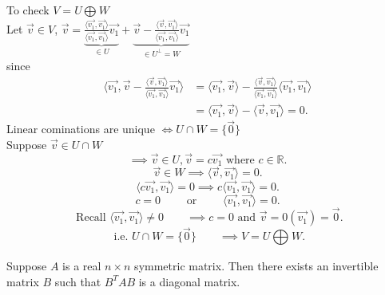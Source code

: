 \documentclass{report}
\begin{document}
{         To check $ V = U \bigoplus_{} W$ \\
         Let $ \vec{ v} \in V$, $ \vec{ v} = \underbrace{ \frac{ \langle \vec{ v_1} ,\vec{ v_1}   \rangle   }{ \langle \vec{ v_1} ,\vec{ v_1}   \rangle  } \vec{ v_1}  }_{  \in U} +  \underbrace{ \vec{ v} - \frac{ \langle \vec{ v} , \vec{ v_1}   \rangle   }{ \langle \vec{ v_1} , \vec{ v_1} \rangle  } \vec{ v_1}  }_{ \in U ^{\perp} = W }$\\
         since 
         \begin{align*}
          \langle \vec{ v_1} ,\vec{ v} - \frac{ \langle \vec{ v} , \vec{ v_1}   \rangle   }{ \langle \vec{ v_1} , \vec{ v_1}   \rangle   } \vec{ v_1}   \rangle &= \langle \vec{ v_1} ,\vec{ v}   \rangle - \frac{ \langle \vec{ v} , \vec{ v_1}   \rangle   }{ \langle \vec{ v_1} , \vec{ v_1}   \rangle   }  \langle \vec{ v_1} ,\vec{ v_1}   \rangle  \\
          &= \langle \vec{ v_1} ,\vec{ v}   \rangle - \langle \vec{ v} , \vec{ v_1}   \rangle =0
         .\end{align*}
         Linear cominations are unique $  \iff U \cap W = \{ \vec{ 0} \}$ \\
         Suppose $ \vec{ v} \in U \cap  W$
         \[
         \implies \vec{ v} \in U, \vec{ v} = c \vec{ v_1} \text{ where } c \in \mathbb{R}
         .\] 
         \[
         \vec{ v} \in W \implies \langle \vec{ v} , \vec{ v_1}   \rangle =0
         .\] 
         \[
         \langle c \vec{ v_1} , \vec{ v_1}   \rangle =0 \implies c \langle \vec{ v_1} , \vec{ v_1}   \rangle =0
         .\] 
         \[
         c=0 \qquad  \text{ or } \qquad  \langle \vec{ v_1} , \vec{ v_1}   \rangle =0
         .\] 
         \[
         \text{ Recall } \langle \vec{ v_1} , \vec{ v_1}   \rangle \neq 0 \qquad  \implies c=0 \text{ and } \vec{ v} = 0 \left( \vec{ v_1}  \right) = \vec{ 0} 
         .\] 
         \[
         \text{ i.e.  } U \cap W = \{ \vec{ 0} \} \qquad  \implies V = U \bigoplus_{} W
         .\] 
         
         }
         \thm{}
         {
         Suppose $ A$ is a real $n \times n$  symmetric matrix. Then there exists an invertible matrix $ B$ such that $ B ^{T}A B$ is a diagonal matrix.\\
         }
\end{document}
